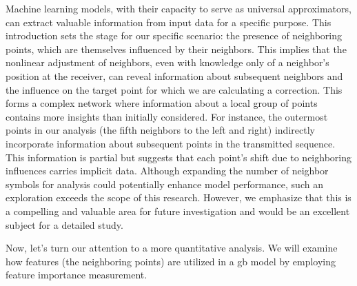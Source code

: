 Machine learning models, with their capacity to serve as universal approximators, can extract valuable information from input data for a specific purpose. This introduction sets the stage for our specific scenario: the presence of neighboring points, which are themselves influenced by their neighbors. This implies that the nonlinear adjustment of neighbors, even with knowledge only of a neighbor's position at the receiver, can reveal information about subsequent neighbors and the influence on the target point for which we are calculating a correction. This forms a complex network where information about a local group of points contains more insights than initially considered. For instance, the outermost points in our analysis (the fifth neighbors to the left and right) indirectly incorporate information about subsequent points in the transmitted sequence. This information is partial but suggests that each point's shift due to neighboring influences carries implicit data. Although expanding the number of neighbor symbols for analysis could potentially enhance model performance, such an exploration exceeds the scope of this research. However, we emphasize that this is a compelling and valuable area for future investigation and would be an excellent subject for a detailed study.

Now, let's turn our attention to a more quantitative analysis. We will examine how features (the neighboring points) are utilized in a \acrlong{gb} model by employing feature importance measurement.




